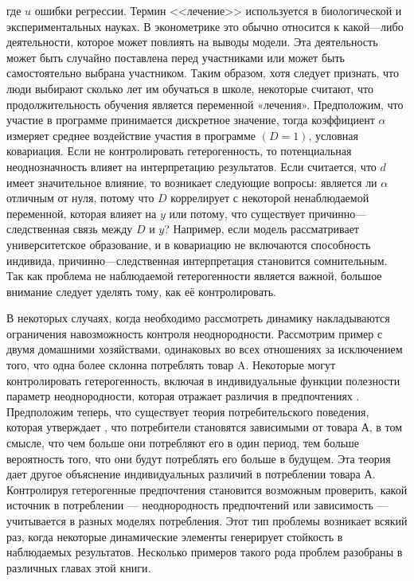 где $u$ ошибки регрессии. Термин <<лечение>> используется в биологической и экспериментальных науках. В эконометрике это обычно относится к какой---либо деятельности, которое может повлиять на выводы модели. Эта деятельность может быть случайно поставлена перед участниками или может быть самостоятельно выбрана участником. Таким образом, хотя следует признать, что люди выбирают сколько лет им обучаться в школе, некоторые считают, что продолжительность обучения является переменной «лечения». Предположим, что участие в программе принимается дискретное значение, тогда коэффициент $\alpha$ измеряет среднее воздействие участия в программе $(D = 1)$, условная ковариация. Если не контролировать гетерогенность, то потенциальная неоднозначность влияет на интерпретацию результатов. Если считается, что $d$ имеет значительное влияние, то возникает следующие вопросы: является ли $\alpha$ отличным от нуля, потому что $D$ коррелирует с некоторой ненаблюдаемой переменной, которая влияет на $y$ или потому, что существует причинно---следственная связь между $D$ и $y$? Например, если модель рассматривает университетское образование, и в ковариацию не включаются способность индивида, причинно---следственная интерпретация становится сомнительным. Так как проблема не наблюдаемой гетерогенности является важной, большое внимание следует уделять тому, как её контролировать. 


	В некоторых случаях, когда необходимо рассмотреть динамику накладываются ограничения навозможность контроля неоднородности. Рассмотрим пример с двумя домашними хозяйствами, одинаковых во всех отношениях за исключением того, что одна более склонна потреблять товар A. Некоторые могут контролировать гетерогенность, включая в  индивидуальные функции полезности параметр неоднородности, которая отражает различия в предпочтениях . Предположим теперь, что существует теория потребительского поведения, которая утверждает , что потребители становятся зависимыми от товара А, в том смысле, что чем больше они потребляют его в один период, тем больше вероятность того, что они будут потреблять его больше в будущем. Эта теория дает другое объяснение индивидуальных различий в потреблении товара А. Контролируя гетерогенные предпочтения становится возможным проверить, какой источник в потреблении --- неоднородность предпочтений или зависимость --- учитывается в разных моделях потребления. Этот тип проблемы возникает всякий раз, когда некоторые динамические элементы генерирует стойкость в наблюдаемых результатов. Несколько примеров такого рода проблем разобраны в различных главах этой книги.
	
